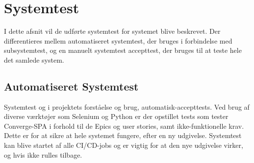 \section{Systemtest}

I dette afsnit vil de udførte systemtest for systemet blive beskrevet. Der differentieres mellem automatiseret systemtest, der bruges i forbindelse med subsystemtest, og en manuelt systemtest accepttest, der bruges til at teste hele det samlede system.

\subsection{Automatiseret Systemtest}

Systemtest og i projektets forståelse og brug, automatisk-accepttests. Ved brug af diverse værktøjer som Selenium og Python er der opstillet tests som tester Converge-SPA i forhold til de Epics og user stories, samt ikke-funktionelle krav. Dette er for at sikre at hele systemet fungere, efter en ny udgivelse. Systemtest kan blive startet af alle CI/CD-jobs og er vigtig for at den nye udgivelse virker, og hvis ikke rulles tilbage.

